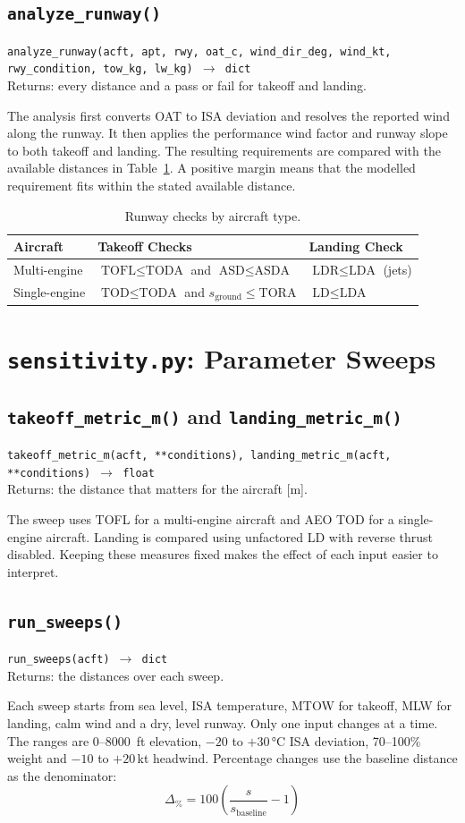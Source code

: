 \documentclass[11pt,letterpaper]{article}
\numberwithin{equation}{section}
\newcommand{\func}[2]{\begin{funcbox}\texttt{#1}\\[2pt]{\color{ink3}Returns:} #2\end{funcbox}}
\newcommand{\code}[1]{\textmd{\texttt{#1}}}
\begin{document}
\subsection{\code{analyze\_runway()}}
\func{analyze\_runway(acft, apt, rwy, oat\_c, wind\_dir\_deg, wind\_kt, rwy\_condition, tow\_kg, lw\_kg) $\rightarrow$ dict}{every distance and a pass or fail for takeoff and landing.}
The analysis first converts OAT to ISA deviation and resolves the reported wind along the runway. It then applies the performance wind factor and runway slope to both takeoff and landing. The resulting requirements are compared with the available distances in Table~\ref{tab:checks}. A positive margin means that the modelled requirement fits within the stated available distance.

\begin{table}[H]
\centering
\begin{tabular}{@{}lll@{}}
\toprule
\textbf{Aircraft} & \textbf{Takeoff Checks} & \textbf{Landing Check}\\
\midrule
Multi-engine & $\text{TOFL} \le \text{TODA}$ \;and\; $\text{ASD} \le \text{ASDA}$ & $\text{LDR} \le \text{LDA}$ (jets)\\
Single-engine & $\text{TOD} \le \text{TODA}$ \;and\; $s_\text{ground} \le \text{TORA}$ & $\text{LD} \le \text{LDA}$\\
\bottomrule
\end{tabular}
\caption{Runway checks by aircraft type.}\label{tab:checks}
\end{table}

\section{\code{sensitivity.py}: Parameter Sweeps}\label{sec:sensitivity}
\subsection{\code{takeoff\_metric\_m()} and \code{landing\_metric\_m()}}
\func{takeoff\_metric\_m(acft, **conditions), landing\_metric\_m(acft, **conditions) $\rightarrow$ float}{the distance that matters for the aircraft [m].}
The sweep uses TOFL for a multi-engine aircraft and AEO TOD for a single-engine aircraft. Landing is compared using unfactored LD with reverse thrust disabled. Keeping these measures fixed makes the effect of each input easier to interpret.

\subsection{\code{run\_sweeps()}}
\func{run\_sweeps(acft) $\rightarrow$ dict}{the distances over each sweep.}
Each sweep starts from sea level, ISA temperature, MTOW for takeoff, MLW for landing, calm wind and a dry, level runway. Only one input changes at a time. The ranges are 0--\SI{8000}{ft} elevation, $-20$ to $+30$\,\si{\celsius} ISA deviation, 70--100\% weight and $-10$ to $+20$\,\si{kt} headwind. Percentage changes use the baseline distance as the denominator:
\begin{equation}
\Delta_\% = 100\left(\frac{s}{s_\text{baseline}} - 1\right) \label{eq:pct}
\end{equation}
\end{document}

